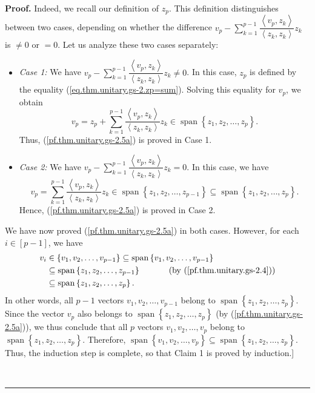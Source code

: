\documentclass[numbers=enddot,12pt,final,onecolumn,notitlepage]{scrartcl}%
\numberwithin{exer}{subsection}
\theoremstyle{definition}
\newenvironment{proof}[1][Proof]{\noindent\textbf{#1.} }{\ \rule{0.5em}{0.5em}}
\let\sumnonlimits\sum
\renewcommand{\sum}{\sumnonlimits\limits}
\begin{document}
\begin{proof}
Indeed, we recall our definition of $z_{p}$. This definition distinguishes
between two cases, depending on whether the difference $v_{p}-\sum_{k=1}%
^{p-1}\dfrac{\left\langle v_{p},z_{k}\right\rangle }{\left\langle z_{k}%
,z_{k}\right\rangle }z_{k}$ is $\neq0$ or $=0$. Let us analyze these two cases separately:

\begin{itemize}
\item \textit{Case 1:} We have $v_{p}-\sum_{k=1}^{p-1}\dfrac{\left\langle
v_{p},z_{k}\right\rangle }{\left\langle z_{k},z_{k}\right\rangle }z_{k}\neq0$.
In this case, $z_{p}$ is defined by the equality
(\ref{eq.thm.unitary.gs-2.zp=sum}). Solving this equality for $v_{p}$, we
obtain%
\[
v_{p}=z_{p}+\sum_{k=1}^{p-1}\dfrac{\left\langle v_{p},z_{k}\right\rangle
}{\left\langle z_{k},z_{k}\right\rangle }z_{k}\in\operatorname*{span}\left\{
z_{1},z_{2},\ldots,z_{p}\right\}  .
\]
Thus, (\ref{pf.thm.unitary.gs-2.5a}) is proved in Case 1.

\item \textit{Case 2:} We have $v_{p}-\sum_{k=1}^{p-1}\dfrac{\left\langle
v_{p},z_{k}\right\rangle }{\left\langle z_{k},z_{k}\right\rangle }z_{k}=0$. In
this case, we have%
\[
v_{p}=\sum_{k=1}^{p-1}\dfrac{\left\langle v_{p},z_{k}\right\rangle
}{\left\langle z_{k},z_{k}\right\rangle }z_{k}\in\operatorname*{span}\left\{
z_{1},z_{2},\ldots,z_{p-1}\right\}  \subseteq\operatorname*{span}\left\{
z_{1},z_{2},\ldots,z_{p}\right\}  .
\]
Hence, (\ref{pf.thm.unitary.gs-2.5a}) is proved in Case 2.
\end{itemize}

We have now proved (\ref{pf.thm.unitary.gs-2.5a}) in both cases. However, for
each $i\in\left[  p-1\right]  $, we have%
\begin{align*}
v_{i}  &  \in\left\{  v_{1},v_{2},\ldots,v_{p-1}\right\}  \subseteq
\operatorname*{span}\left\{  v_{1},v_{2},\ldots,v_{p-1}\right\} \\
&  \subseteq\operatorname*{span}\left\{  z_{1},z_{2},\ldots,z_{p-1}\right\}
\ \ \ \ \ \ \ \ \ \ \left(  \text{by (\ref{pf.thm.unitary.gs-2.4})}\right) \\
&  \subseteq\operatorname*{span}\left\{  z_{1},z_{2},\ldots,z_{p}\right\}  .
\end{align*}
In other words, all $p-1$ vectors $v_{1},v_{2},\ldots,v_{p-1}$ belong to
$\operatorname*{span}\left\{  z_{1},z_{2},\ldots,z_{p}\right\}  $. Since the
vector $v_{p}$ also belongs to $\operatorname*{span}\left\{  z_{1}%
,z_{2},\ldots,z_{p}\right\}  $ (by (\ref{pf.thm.unitary.gs-2.5a})), we thus
conclude that all $p$ vectors $v_{1},v_{2},\ldots,v_{p}$ belong to
$\operatorname*{span}\left\{  z_{1},z_{2},\ldots,z_{p}\right\}  $. Therefore,
$\operatorname*{span}\left\{  v_{1},v_{2},\ldots,v_{p}\right\}  \subseteq
\operatorname*{span}\left\{  z_{1},z_{2},\ldots,z_{p}\right\}  $. Thus, the
induction step is complete, so that Claim 1 is proved by induction.] \medskip


\end{proof}
\end{document}
